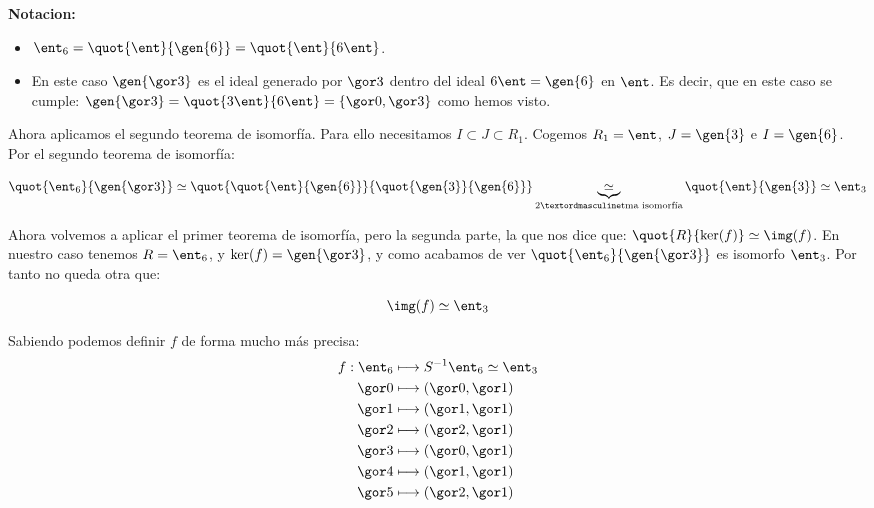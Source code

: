 \begin{example}
	\textbf{Notacion:} 
	\begin{itemize}
		\item $\ent_6 = \quot{\ent}{\gen{6}}= \quot{\ent}{6 \ent}$.
		\item En este caso $\gen{\cls{3}}$ es el ideal generado por $\cls{3}$ dentro del ideal $6\ent=\gen{6}$ en $\ent$. Es decir, que en este caso se cumple: $\gen{\cls{3}}=\quot{3\ent}{6\ent} = \{ \cls{0}, \cls{3}\}$ como hemos visto.
	\end{itemize}
	
	Ahora aplicamos el segundo teorema de isomorfía. Para ello necesitamos $I \subset J \subset R_1$. Cogemos $R_1 = \ent$, $J=\gen{3}$ e $I=\gen{6}$. Por el segundo teorema de isomorfía:
	
	$$ \quot{\ent_6}{\gen{\cls{3}}} \simeq \quot{\quot{\ent}{\gen{6}}}{\quot{\gen{3}}{\gen{6}}} \underbrace{\simeq}_{2º \text{tma isomorfía} } \quot{\ent}{\gen{3}} \simeq \ent_3$$ 
	
	Ahora volvemos a aplicar el primer teorema de isomorfía, pero la segunda parte, la que nos dice que: $\quot{R}{\ker(f)} \simeq \img(f)$. En nuestro caso tenemos $R=\ent_6$, y $\ker(f)=\gen{\cls{3}}$, y como acabamos de ver  $\quot{\ent_6}{\gen{\cls{3}}}$ es isomorfo $\ent_3$. Por tanto no queda otra que:
	
	$$\img(f) \simeq \ent_3$$
	
	Sabiendo podemos definir $f$ de forma mucho más precisa:
	\begin{align*}
		f: \ent_6 & \longmapsto  S^{-1}\ent_6 \simeq \ent_3\\
		\cls{0} & \longmapsto (\cls{0},\cls{1}) \\
		\cls{1} & \longmapsto (\cls{1},\cls{1}) \\
		\cls{2} & \longmapsto (\cls{2},\cls{1}) \\
		\cls{3} & \longmapsto (\cls{0},\cls{1}) \\
		\cls{4} & \longmapsto (\cls{1},\cls{1}) \\
		\cls{5} & \longmapsto (\cls{2},\cls{1}) \\
	\end{align*}
	

\end{example}
